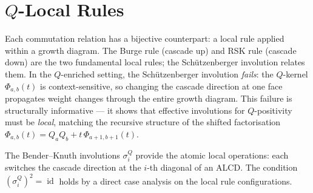 \documentclass[11pt]{report}
\DeclareMathOperator{\id}{id}
\theoremstyle{plain}
\theoremstyle{definition}
\begin{document}



\chapter{$Q$-Local Rules}
\label{ch:local-rules}

Each commutation relation has a bijective counterpart:
a local rule applied within a growth diagram.  The Burge
rule (cascade up) and RSK rule (cascade down) are the two
fundamental local rules; the Sch\"utzenberger involution
relates them.  In the $Q$-enriched setting, the
Sch\"utzenberger involution \emph{fails}: the $Q$-kernel
$\Phi_{a,b}(t)$ is context-sensitive, so changing the
cascade direction at one face propagates weight changes
through the entire growth diagram.  This failure is
structurally informative --- it shows that effective
involutions for $Q$-positivity must be \emph{local},
matching the recursive structure of the shifted
factorisation $\Phi_{a,b}(t) = Q_a Q_b + t\,
\Phi_{a+1,b+1}(t)$.

The Bender--Knuth involutions $\sigma_i^Q$ provide the
atomic local operations: each switches the cascade
direction at the $i$-th diagonal of an ALCD\@.  The
condition $(\sigma_i^Q)^2 = \id$ holds by a direct
case analysis on the local rule configurations.
\end{document}
